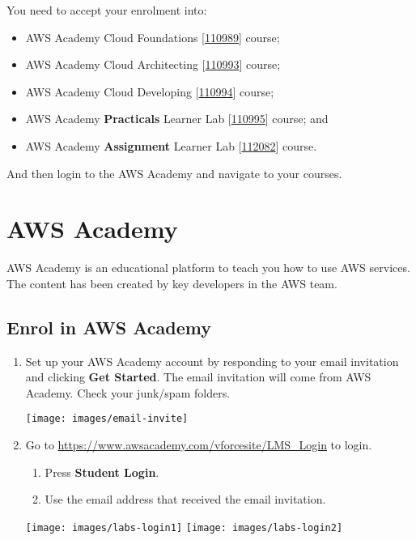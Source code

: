You need to accept your enrolment into:
\begin{itemize}
    \item AWS Academy Cloud Foundations [\href{https://awsacademy.instructure.com/courses/110989}{110989}] course;
    \item AWS Academy Cloud Architecting [\href{https://awsacademy.instructure.com/courses/110993}{110993}] course;
    \item AWS Academy Cloud Developing [\href{https://awsacademy.instructure.com/courses/110994}{110994}] course;
    \item AWS Academy \textbf{Practicals} Learner Lab [\href{https://awsacademy.instructure.com/courses/110995}{110995}] course; and
    \item AWS Academy \textbf{Assignment} Learner Lab [\href{https://awsacademy.instructure.com/courses/112082}{112082}] course.
\end{itemize}
And then login to the AWS Academy and navigate to your courses.

\section{AWS Academy}
AWS Academy is an educational platform to teach you how to use AWS services.
The content has been created by key developers in the AWS team.

\subsection{Enrol in AWS Academy}

\begin{enumerate}
    \item
        Set up your AWS Academy account by responding to your email invitation and clicking \textbf{Get Started}.
        The email invitation will come from AWS Academy.
        Check your junk/spam folders.

        \texttt{[image: images/email-invite]}

    \item Go to \url{https://www.awsacademy.com/vforcesite/LMS_Login} to login.
    \begin{enumerate}
        \item Press \textbf{Student Login}.
        \item Use the email address that received the email invitation.
    \end{enumerate}

    \hspace{9mm}
    \texttt{[image: images/labs-login1]}
    \hspace{5mm}
    \texttt{[image: images/labs-login2]}
\end{enumerate}



